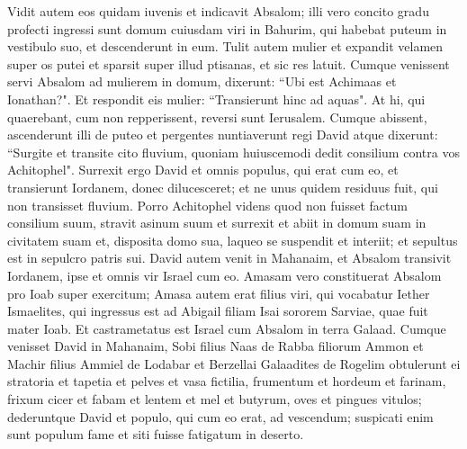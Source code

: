 \begin{biblechapter}
\verse Vidit autem eos quidam iuvenis et indicavit Absalom; illi vero concito gradu profecti ingressi sunt domum cuiusdam viri in Bahurim, qui habebat puteum in vestibulo suo, et descenderunt in eum. 
\verse Tulit autem mulier et expandit velamen super os putei et sparsit super illud ptisanas, et sic res latuit. 
\verse Cumque venissent servi Absalom ad mulierem in domum, dixerunt: “Ubi est Achimaas et Ionathan?". Et respondit eis mulier: “Transierunt hinc ad aquas". At hi, qui quaerebant, cum non repperissent, reversi sunt Ierusalem. 
\verse Cumque abissent, ascenderunt illi de puteo et pergentes nuntiaverunt regi David atque dixerunt: “Surgite et transite cito fluvium, quoniam huiuscemodi dedit consilium contra vos Achitophel". 
\verse Surrexit ergo David et omnis populus, qui erat cum eo, et transierunt Iordanem, donec dilucesceret; et ne unus quidem residuus fuit, qui non transisset fluvium. 
\verse Porro Achitophel videns quod non fuisset factum consilium suum, stravit asinum suum et surrexit et abiit in domum suam in civitatem suam et, disposita domo sua, laqueo se suspendit et interiit; et sepultus est in sepulcro patris sui. 
\verse David autem venit in Mahanaim, et Absalom transivit Iordanem, ipse et omnis vir Israel cum eo. 
\verse Amasam vero constituerat Absalom pro Ioab super exercitum; Amasa autem erat filius viri, qui vocabatur Iether Ismaelites, qui ingressus est ad Abigail filiam Isai sororem Sarviae, quae fuit mater Ioab.  
\verse Et castrametatus est Israel cum Absalom in terra Galaad. 
\verse Cumque venisset David in Mahanaim, Sobi filius Naas de Rabba filiorum Ammon et Machir filius Ammiel de Lodabar et Berzellai Galaadites de Rogelim 
\verse obtulerunt ei stratoria et tapetia et pelves et vasa fictilia, frumentum et hordeum et farinam, frixum cicer et fabam et lentem 
\verse et mel et butyrum, oves et pingues vitulos; dederuntque David et populo, qui cum eo erat, ad vescendum; suspicati enim sunt populum fame et siti fuisse fatigatum in deserto. 
\end{biblechapter}

